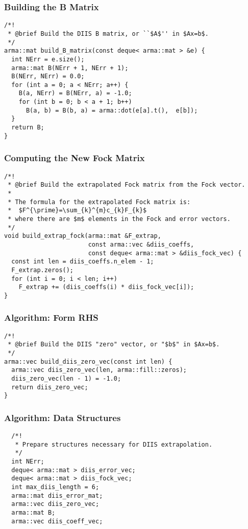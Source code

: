 \documentclass[10pt,compress,red]{beamer}
\begin{document}
\begin{frame}[fragile]
\frametitle{Building the B Matrix}
\begin{verbatim}
/*!
 * @brief Build the DIIS B matrix, or ``$A$'' in $Ax=b$.
 */
arma::mat build_B_matrix(const deque< arma::mat > &e) {
  int NErr = e.size();
  arma::mat B(NErr + 1, NErr + 1);
  B(NErr, NErr) = 0.0;
  for (int a = 0; a < NErr; a++) {
    B(a, NErr) = B(NErr, a) = -1.0;
    for (int b = 0; b < a + 1; b++)
      B(a, b) = B(b, a) = arma::dot(e[a].t(),  e[b]);
  }
  return B;
}
\end{verbatim}
\end{frame}

\begin{frame}[fragile]
\frametitle{Computing the New Fock Matrix}
\begin{verbatim}
/*!
 * @brief Build the extrapolated Fock matrix from the Fock vector.
 *
 * The formula for the extrapolated Fock matrix is:
 *  $F^{\prime}=\sum_{k}^{m}c_{k}F_{k}$
 * where there are $m$ elements in the Fock and error vectors.
 */
void build_extrap_fock(arma::mat &F_extrap,
                       const arma::vec &diis_coeffs,
                       const deque< arma::mat > &diis_fock_vec) {
  const int len = diis_coeffs.n_elem - 1;
  F_extrap.zeros();
  for (int i = 0; i < len; i++)
    F_extrap += (diis_coeffs(i) * diis_fock_vec[i]);
}
\end{verbatim}
\end{frame}

\begin{frame}[fragile]
\frametitle{Algorithm: Form RHS}
\begin{verbatim}
/*!
 * @brief Build the DIIS "zero" vector, or "$b$" in $Ax=b$.
 */
arma::vec build_diis_zero_vec(const int len) {
  arma::vec diis_zero_vec(len, arma::fill::zeros);
  diis_zero_vec(len - 1) = -1.0;
  return diis_zero_vec;
}
\end{verbatim}
\end{frame}

\begin{frame}[fragile]
\frametitle{Algorithm: Data Structures}
\begin{verbatim}
  /*!
   * Prepare structures necessary for DIIS extrapolation.
   */
  int NErr;
  deque< arma::mat > diis_error_vec;
  deque< arma::mat > diis_fock_vec;
  int max_diis_length = 6;
  arma::mat diis_error_mat;
  arma::vec diis_zero_vec;
  arma::mat B;
  arma::vec diis_coeff_vec;
\end{verbatim}
\end{frame}
\end{document}
